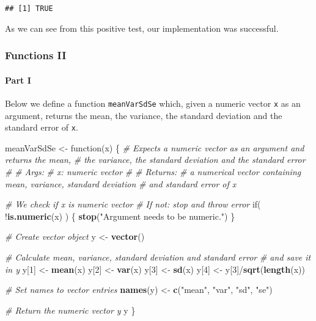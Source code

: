 \documentclass[11,]{article}
\newenvironment{Shaded}{\begin{snugshade}}{\end{snugshade}}
\newcommand{\KeywordTok}[1]{\textcolor[rgb]{0.13,0.29,0.53}{\textbf{{#1}}}}
\newcommand{\DecValTok}[1]{\textcolor[rgb]{0.00,0.00,0.81}{{#1}}}
\newcommand{\StringTok}[1]{\textcolor[rgb]{0.31,0.60,0.02}{{#1}}}
\newcommand{\CommentTok}[1]{\textcolor[rgb]{0.56,0.35,0.01}{\textit{{#1}}}}
\newcommand{\NormalTok}[1]{{#1}}
\begin{document}
\begin{verbatim}
## [1] TRUE
\end{verbatim}

As we can see from this positive test, our implementation was
successful.

\subsubsection{Functions II}\label{functions-ii}

\paragraph{Part I}\label{part-i}

Below we define a function \texttt{meanVarSdSe} which, given a numeric
vector \texttt{x} as an argument, returns the mean, the variance, the
standard deviation and the standard error of \texttt{x}.

\begin{Shaded}
\begin{Highlighting}[]
\NormalTok{meanVarSdSe <-}\StringTok{ }\NormalTok{function(x) \{}
  \CommentTok{# Expects a numeric vector as an argument and returns the mean,}
  \CommentTok{# the variance, the standard deviation and the standard error}
  \CommentTok{# }
  \CommentTok{# Args:}
  \CommentTok{#   x: numeric vector}
  \CommentTok{#}
  \CommentTok{# Returns:}
  \CommentTok{#   a numerical vector containing mean, variance, standard deviation}
  \CommentTok{#   and standard error of x}
  
  \CommentTok{# We check if x is numeric vector}
  \CommentTok{# If not: stop and throw error}
  \NormalTok{if( !}\KeywordTok{is.numeric}\NormalTok{(x) ) \{}
    \KeywordTok{stop}\NormalTok{(}\StringTok{"Argument needs to be numeric."}\NormalTok{)}
  \NormalTok{\}}
  
  \CommentTok{# Create vector object}
  \NormalTok{y <-}\StringTok{ }\KeywordTok{vector}\NormalTok{()}
  
  \CommentTok{# Calculate mean, variance, standard deviation and standard error}
  \CommentTok{# and save it in y}
  \NormalTok{y[}\DecValTok{1}\NormalTok{] <-}\StringTok{ }\KeywordTok{mean}\NormalTok{(x)}
  \NormalTok{y[}\DecValTok{2}\NormalTok{] <-}\StringTok{ }\KeywordTok{var}\NormalTok{(x)}
  \NormalTok{y[}\DecValTok{3}\NormalTok{] <-}\StringTok{ }\KeywordTok{sd}\NormalTok{(x)}
  \NormalTok{y[}\DecValTok{4}\NormalTok{] <-}\StringTok{ }\NormalTok{y[}\DecValTok{3}\NormalTok{]/}\KeywordTok{sqrt}\NormalTok{(}\KeywordTok{length}\NormalTok{(x))}
  
  \CommentTok{# Set names to vector entries}
  \KeywordTok{names}\NormalTok{(y) <-}\StringTok{ }\KeywordTok{c}\NormalTok{(}\StringTok{"mean"}\NormalTok{, }\StringTok{"var"}\NormalTok{, }\StringTok{"sd"}\NormalTok{, }\StringTok{"se"}\NormalTok{)}
  
  \CommentTok{# Return the numeric vector y}
  \NormalTok{y}
\NormalTok{\}}
\end{Highlighting}
\end{Shaded}
\end{document}
